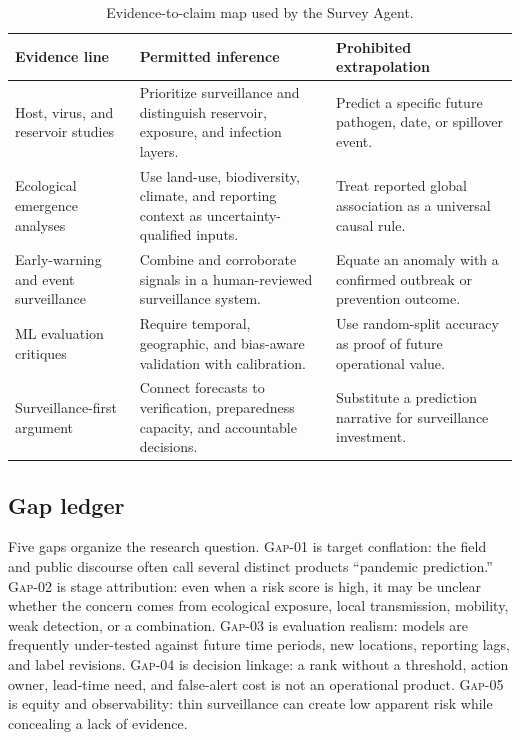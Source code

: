 \documentclass[conference]{IEEEtran}
\newcommand{\stage}[1]{\textsc{#1}}
\begin{document}
\begin{table}[t]
\caption{Evidence-to-claim map used by the Survey Agent.}
\label{tab:evidence}
\centering
\renewcommand{\arraystretch}{1.2}
\begin{tabular}{|p{}|p{}|p{}|}
\hline
\textbf{Evidence line} & \textbf{Permitted inference} & \textbf{Prohibited extrapolation} \\
\hline
Host, virus, and reservoir studies \cite{olival2017,pandit2018,basinski2021} & Prioritize surveillance and distinguish reservoir, exposure, and infection layers. & Predict a specific future pathogen, date, or spillover event. \\
\hline
Ecological emergence analyses \cite{allen2017} & Use land-use, biodiversity, climate, and reporting context as uncertainty-qualified inputs. & Treat reported global association as a universal causal rule. \\
\hline
Early-warning and event surveillance \cite{meckawy2022,keller2009,freifeld2008,polo2020} & Combine and corroborate signals in a human-reviewed surveillance system. & Equate an anomaly with a confirmed outbreak or prevention outcome. \\
\hline
ML evaluation critiques \cite{kawasaki2025} & Require temporal, geographic, and bias-aware validation with calibration. & Use random-split accuracy as proof of future operational value. \\
\hline
Surveillance-first argument \cite{holmes2018} & Connect forecasts to verification, preparedness capacity, and accountable decisions. & Substitute a prediction narrative for surveillance investment. \\
\hline
\end{tabular}
\end{table}

\subsection{Gap ledger}

Five gaps organize the research question. \stage{Gap-01} is target conflation: the field and public discourse often call several distinct products ``pandemic prediction.'' \stage{Gap-02} is stage attribution: even when a risk score is high, it may be unclear whether the concern comes from ecological exposure, local transmission, mobility, weak detection, or a combination. \stage{Gap-03} is evaluation realism: models are frequently under-tested against future time periods, new locations, reporting lags, and label revisions. \stage{Gap-04} is decision linkage: a rank without a threshold, action owner, lead-time need, and false-alert cost is not an operational product. \stage{Gap-05} is equity and observability: thin surveillance can create low apparent risk while concealing a lack of evidence.
\end{document}
